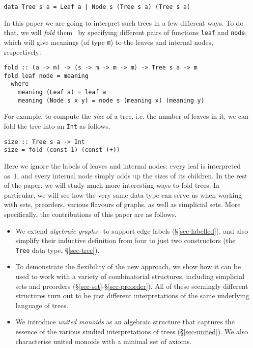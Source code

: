 \documentclass[english,submission]{programming}
\newcommand{\code}[1]{\lstinline[mathescape]|#1|}
\newcommand{\hcode}[1]{{\color{darkblue} \lstinline[keywordstyle={}]|#1|}} %
\begin{document}
\begin{lstlisting}
data Tree s a = Leaf a | Node s (Tree s a) (Tree s a)
\end{lstlisting}

\noindent
In this paper we are going to interpret such trees in a few different ways. To
do that, we will \emph{fold} them~\cite{gibbons_folds} by specifying different
pairs of functions \hcode{leaf} and \hcode{node}, which will give meanings (of
type \hcode{m}) to the leaves and internal nodes, respectively:

\begin{lstlisting}
fold :: (a -> m) -> (s -> m -> m -> m) -> Tree s a -> m
fold leaf node = meaning
  where
    meaning (Leaf a) = leaf a
    meaning (Node s x y) = node s (meaning x) (meaning y)
\end{lstlisting}

\noindent
For example, to compute the \emph{size} of a tree, i.e. the number of leaves in
it, we can fold the tree into an \code{Int} as follows.

\begin{lstlisting}
size :: Tree s a -> Int
size = fold (const 1) (const (+))
\end{lstlisting}

\noindent
Here we ignore the labels of leaves and internal nodes: every leaf is
interpreted as~$1$, and every internal node simply adds up the sizes of its
children. In the rest of the paper, we will study much more interesting ways to
fold trees. In particular, we will see how the very same data type can serve us
when working with sets, preorders, various flavours of graphs, as well as
simplicial sets. More specifically, the contributions of this paper are as
follows.

\begin{itemize}
  \item We extend \emph{algebraic graphs}~\cite{mokhov_alga} to support edge
  labels (\S\ref{sec-labelled}), and also simplify their inductive definition
  from four to just two constructors (the \code{Tree} data type,
  \S\ref{sec-tree}).

  \item To demonstrate the flexibility of the new approach, we show how it can
  be used to work with a variety of combinatorial structures, including
  simplicial sets and preorders (\S\ref{sec-set}-\S\ref{sec-preorder}). All of
  these seemingly different structures turn out to be just different
  interpretations of the same underlying language of trees.

  \item We introduce \emph{united monoids} as an algebraic structure that
  captures the essence of the various studied interpretations of trees
  (\S\ref{sec-united}). We also characterise united monoids with a minimal set
  of axioms.
\end{itemize}
\end{document}
